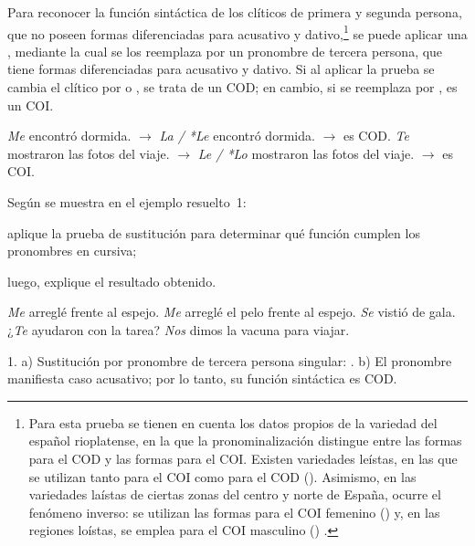 Para reconocer la función sintáctica de los clíticos de primera y segunda
persona, que no poseen formas diferenciadas para acusativo y
dativo,\footnote{Para esta prueba se tienen en cuenta los datos propios de la
variedad del español rioplatense, en la que la pronominalización distingue entre
las formas  para el COD y las formas 
para el COI. Existen variedades leístas, en las que se utilizan 
tanto para el COI como para el COD (). Asimismo, en las variedades laístas de ciertas zonas
del centro y norte de España, ocurre el fenómeno inverso: se utilizan las formas
 para el COI femenino () y, en las regiones loístas, se emplea
 para el COI masculino () \parencite{bosque2019}.} se puede aplicar una
, mediante la cual se los reemplaza por un
pronombre de tercera persona, que tiene formas diferenciadas para acusativo y
dativo. Si al aplicar la prueba se cambia el clítico por  o
, se trata de un COD; en cambio, si se reemplaza por ,
es un COI.

\begin{exe}
  \ex \textit{Me} encontró dormida. $\rightarrow$ \textit{La / *Le} encontró
      dormida. $\rightarrow$  es COD.
  \ex \textit{Te} mostraron las fotos del viaje. $\rightarrow$ \textit{Le / *Lo}
      mostraron las fotos del viaje. $\rightarrow$  es
      COI.
\end{exe}

\begin{ejercicio}\label{ej:10-sustitucion}
Según se muestra en el ejemplo resuelto~1:

\begin{consignas}
  \item aplique la prueba de sustitución para determinar qué función cumplen
        los pronombres en cursiva;
  \item luego, explique el resultado obtenido.
\end{consignas}

\begin{exe}
  \ex \textit{Me} arreglé frente al espejo.
  \ex \textit{Me} arreglé el pelo frente al espejo.
  \ex \textit{Se} vistió de gala.
  \ex ¿\textit{Te} ayudaron con la tarea?
  \ex \textit{Nos} dimos la vacuna para viajar.
\end{exe}

\begin{resuelto}
1. a) Sustitución por pronombre de tercera persona singular: . b) El pronombre manifiesta caso acusativo; por lo tanto, su
función sintáctica es COD.
\end{resuelto}
\end{ejercicio}

